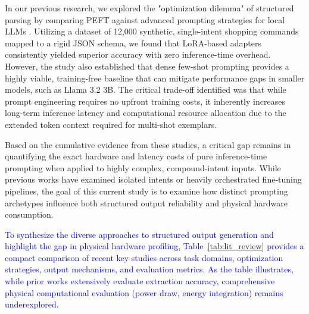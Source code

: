 \documentclass[journal,article,submit,pdftex,moreauthors]{Definitions/mdpi}
\begin{document}
In our previous research, we explored the "optimization dilemma" of structured parsing by comparing PEFT against advanced prompting strategies for local LLMs \cite{karlovic2026}. Utilizing a dataset of 12,000 synthetic, single-intent shopping commands mapped to a rigid JSON schema, we found that LoRA-based adapters consistently yielded superior accuracy with zero inference-time overhead. However, the study also established that dense few-shot prompting provides a highly viable, training-free baseline that can mitigate performance gaps in smaller models, such as Llama 3.2 3B. The critical trade-off identified was that while prompt engineering requires no upfront training costs, it inherently increases long-term inference latency and computational resource allocation due to the extended token context required for multi-shot exemplars.

Based on the cumulative evidence from these studies, a critical gap remains in quantifying the exact hardware and latency costs of pure inference-time prompting when applied to highly complex, compound-intent inputs. While previous works have examined isolated intents or heavily orchestrated fine-tuning pipelines, the goal of this current study is to examine how distinct prompting archetypes influence both structured output reliability and physical hardware consumption. 

\textcolor{blue}{To synthesize the diverse approaches to structured output generation and highlight the gap in physical hardware profiling, Table~\ref{tab:lit_review} provides a compact comparison of recent key studies across task domains, optimization strategies, output mechanisms, and evaluation metrics. As the table illustrates, while prior works extensively evaluate extraction accuracy, comprehensive physical computational evaluation (power draw, energy integration) remains underexplored.}
\end{document}
